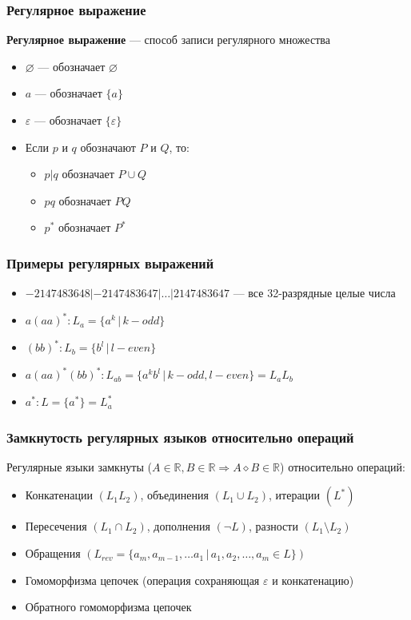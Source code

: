 \documentclass{beamer}
\begin{document}
\begin{frame}[fragile]
  \transwipe[direction=90]
  \frametitle{Регулярное выражение}
    \textbf{Регулярное выражение} --- способ записи регулярного множества
    \begin{itemize}
      \item $\varnothing $ --- обозначает $\varnothing$
      \item $a$  --- обозначает $\{a\}$ 
      \item $\varepsilon$  --- обозначает $\{\varepsilon\}$ 
      \item Если $p$ и $q$ обозначают $P$ и $Q$, то:
      \begin{itemize}
        \item $p | q$ обозначает $P \cup Q$ 
        \item $pq$ обозначает $PQ$
        \item $p^*$ обозначает $P^*$
      \end{itemize}
    \end{itemize}
\end{frame}

\begin{frame}[fragile]
  \transwipe[direction=90]
  \frametitle{Примеры регулярных выражений}
  \begin{itemize}
    \item $-2 147 483 648 | -2 147 483 647 | \dots |  2 147 483 647$ --- все 32-разрядные целые числа
    \item $a(aa)^*: L_a = \{a^k \, | \, k - odd \} $
    \item $(bb)^*: L_b = \{b^l \, | \, l - even \} $
    \item $a(aa)^* (bb)^* :  L_{ab} = \{a^k b^l \, | \, k - odd, l - even\} =  L_a L_b$   
    \item $a^* : L = \{a^*\} = L_a^*$
  \end{itemize}
\end{frame}


\begin{frame}[fragile]
  \transwipe[direction=90]
  \frametitle{Замкнутость регулярных языков относительно операций}
  Регулярные языки замкнуты ($A \in \mathbb{R}, B \in \mathbb{R} \Rightarrow A \diamond B \in \mathbb{R}$) относительно операций: 
  \begin{itemize}
    \item Конкатенации $ (L_1 L_2) $, объединения $ (L_1 \cup L_2) $, итерации $ (L^*) $
    \item Пересечения $ (L_1 \cap L_2) $, дополнения $ (\neg L)$, разности $ (L_1 \setminus L_2) $
    \item Обращения $(L_{rev} = \{a_m, a_{m-1}, \dots a_1 \, | \, a_1, a_2, \dots, a_m \in L \})$
    \item Гомоморфизма цепочек (операция сохраняющая $\varepsilon$ и конкатенацию)
    \item Обратного гомоморфизма цепочек
  \end{itemize}
\end{frame}
\end{document}
